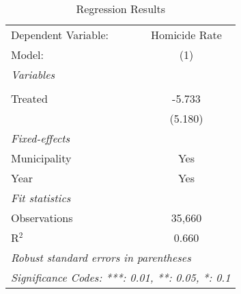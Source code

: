 \documentclass{article}
\begin{document}
\begin{table}[H]
   \caption{Regression Results}
   \centering
   \begin{tabular}{lc}
      \toprule \toprule
      Dependent Variable: & \multicolumn{1}{c}{Homicide Rate} \\
      Model:              & (1) \\  
      \midrule
      \emph{Variables} \\\\
      Treated             & -5.733 \\
                          & (5.180) \\
      \midrule
      \emph{Fixed-effects} \\
      Municipality        & Yes \\
      Year                & Yes \\
      \midrule
      \emph{Fit statistics} \\
      Observations        & 35,660 \\
      R$^2$               & 0.660 \\
      \midrule \midrule
      \multicolumn{2}{l}{\emph{Robust standard errors in parentheses}} \\
      \multicolumn{2}{l}{\emph{Significance Codes: ***: 0.01, **: 0.05, *: 0.1}} \\
   \end{tabular}
\end{table}
\end{document}
